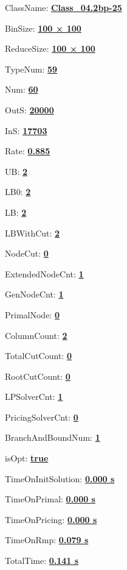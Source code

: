 \documentclass[11pt]{article}
\begin{document}
\pagestyle{empty}


ClassName: \underline{\textbf{Class_04.2bp-25}}
\par
BinSize: \underline{\textbf{100 × 100}}
\par
ReduceSize: \underline{\textbf{100 × 100}}
\par
TypeNum: \underline{\textbf{59}}
\par
Num: \underline{\textbf{60}}
\par
OutS: \underline{\textbf{20000}}
\par
InS: \underline{\textbf{17703}}
\par
Rate: \underline{\textbf{0.885}}
\par
UB: \underline{\textbf{2}}
\par
LB0: \underline{\textbf{2}}
\par
LB: \underline{\textbf{2}}
\par
LBWithCut: \underline{\textbf{2}}
\par
NodeCut: \underline{\textbf{0}}
\par
ExtendedNodeCnt: \underline{\textbf{1}}
\par
GenNodeCnt: \underline{\textbf{1}}
\par
PrimalNode: \underline{\textbf{0}}
\par
ColumnCount: \underline{\textbf{2}}
\par
TotalCutCount: \underline{\textbf{0}}
\par
RootCutCount: \underline{\textbf{0}}
\par
LPSolverCnt: \underline{\textbf{1}}
\par
PricingSolverCnt: \underline{\textbf{0}}
\par
BranchAndBoundNum: \underline{\textbf{1}}
\par
isOpt: \underline{\textbf{true}}
\par
TimeOnInitSolution: \underline{\textbf{0.000 s}}
\par
TimeOnPrimal: \underline{\textbf{0.000 s}}
\par
TimeOnPricing: \underline{\textbf{0.000 s}}
\par
TimeOnRmp: \underline{\textbf{0.079 s}}
\par
TotalTime: \underline{\textbf{0.141 s}}
\par
\newpage
\end{document}
